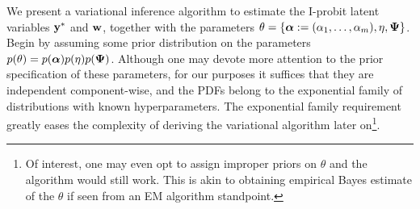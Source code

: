 We present a variational inference algorithm to estimate the I-probit latent variables ${\mathbf y}^*$ and ${\mathbf w}$, together with the parameters $\theta = \{{\bm\alpha}:=(\alpha_1,\dots,\alpha_m),\eta,{\bm\Psi} \}$.
Begin by assuming some prior distribution on the parameters $p(\theta) = p({\bm\alpha})p(\eta)p({\bm\Psi})$. 
Although one may devote more attention to the prior specification of these parameters, for our purposes it suffices that they are independent component-wise, and the PDFs belong to the exponential family of distributions with known hyperparameters.
The exponential family requirement greatly eases the complexity of deriving the variational algorithm later on\footnote{
Of interest, one may even opt to assign improper priors on $\theta$ and the algorithm would still work.
This is akin to obtaining empirical Bayes estimate of the $\theta$ if seen from an EM algorithm standpoint.
}.

